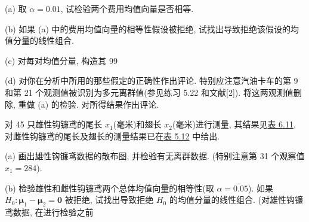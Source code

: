 (a) 取 $\alpha=0.01$, 试检验两个费用均值向量是否相等.

(b) 如果 (a) 中的费用均值向量的相等性假设被拒绝, 试找出导致拒绝该假设的均值分量的线性组合.

(c) 对每对均值分量, 构造其 99%

(d) 对你在分析中所用的那些假定的正确性作出评论. 特别应注意汽油卡车的第 9 和第 21 个观测值被识别为多元离群值(参见练习 5.22 和文献[2]). 将这两观测值删除, 重做 (a) 的检验. 对所得结果作出评论.

\medskip
{}\quad 对 45 只雄性钩镰鸢的尾长 $x_{1}$(毫米)和翅长 $x_{2}$(毫米)进行测量, 其结果见\hyperref[tab:6.11]{表 6.11}, 对雌性钩镰鸢的尾长及翅长的测量结果已在\hyperref[tab:5.12]{表 5.12} 中给出.

(a) 画出雄性钩镰鸢数据的散布图, 并检验有无离群数据. (特别注意第 31 个观察值 $x_{1}=284$).

(b) 检验雄性和雌性钩镰鸢两个总体均值向量的相等性(取 $\alpha=0.05$). 如果 $H_{0}: \boldsymbol{\mu}_{1}-\boldsymbol{\mu}_{2}=\mathbf{0}$ 被拒绝, 试找出导致拒绝 $H_{0}$ 的均值分量的线性组合. (对雄性钩镰鸢数据, 在进行检验之前
